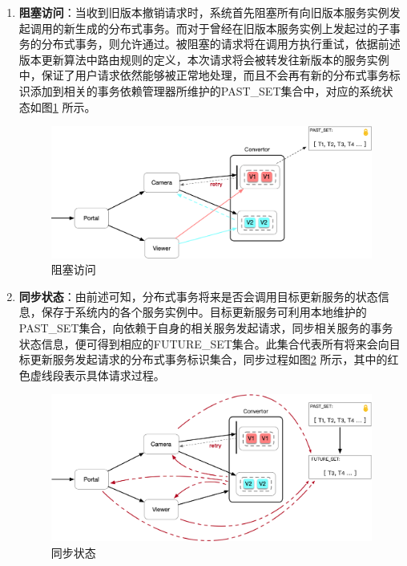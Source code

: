\documentclass[macfonts,master]{njuthesis}
\begin{document}
\begin{enumerate}
	\item \textbf{阻塞访问}：当收到旧版本撤销请求时，系统首先阻塞所有向旧版本服务实例发起调用的新生成的分布式事务。而对于曾经在旧版本服务实例上发起过的子事务的分布式事务，则允许通过。被阻塞的请求将在调用方执行重试，依据前述版本更新算法中路由规则的定义，本次请求将会被转发往新版本的服务实例中，保证了用户请求依然能够被正常地处理，而且不会再有新的分布式事务标识添加到相关的事务依赖管理器所维护的PAST\_SET集合中，对应的系统状态如图\ref{fig:revoke_1} 所示。

	\begin{figure}[!htbp]
	  \centering
	  \includegraphics[width= 1.0\textwidth]{image/revoke_1.png}
	  \caption{阻塞访问}
	  \label{fig:revoke_1}
	\end{figure}

	\item \textbf{同步状态}：由前述可知，分布式事务将来是否会调用目标更新服务的状态信息，保存于系统内的各个服务实例中。目标更新服务可利用本地维护的PAST\_SET集合，向依赖于自身的相关服务发起请求，同步相关服务的事务状态信息，便可得到相应的FUTURE\_SET集合。此集合代表所有将来会向目标更新服务发起请求的分布式事务标识集合，同步过程如图\ref{fig:revoke_2} 所示，其中的红色虚线段表示具体请求过程。

	\begin{figure}[!htbp]
	  \centering
	  \includegraphics[width= 1.0\textwidth]{image/revoke_2.png}
	  \caption{同步状态}
	  \label{fig:revoke_2}
	\end{figure}


\end{enumerate}
\end{document}
